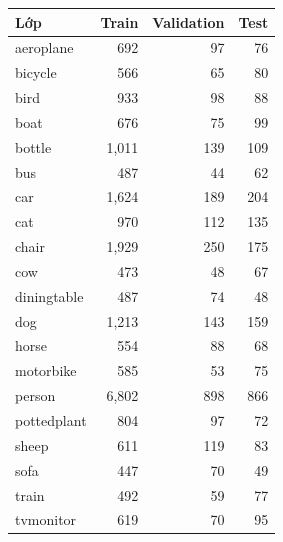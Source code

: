 \begin{tabular}{lrrr}
\toprule
Lớp & Train & Validation & Test\\
\midrule
aeroplane & 692 & 97 & 76\\
bicycle & 566 & 65 & 80\\
bird & 933 & 98 & 88\\
boat & 676 & 75 & 99\\
bottle & 1,011 & 139 & 109\\
bus & 487 & 44 & 62\\
car & 1,624 & 189 & 204\\
cat & 970 & 112 & 135\\
chair & 1,929 & 250 & 175\\
cow & 473 & 48 & 67\\
diningtable & 487 & 74 & 48\\
dog & 1,213 & 143 & 159\\
horse & 554 & 88 & 68\\
motorbike & 585 & 53 & 75\\
person & 6,802 & 898 & 866\\
pottedplant & 804 & 97 & 72\\
sheep & 611 & 119 & 83\\
sofa & 447 & 70 & 49\\
train & 492 & 59 & 77\\
tvmonitor & 619 & 70 & 95\\
\bottomrule
\end{tabular}

